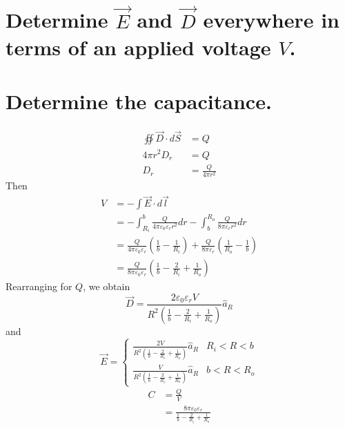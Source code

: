 \documentclass[answers]{exam}
\begin{document}
\begin{questions}

\begin{parts}
	\part{Determine $\vec{E}$ and $\vec{D}$ everywhere in terms of an applied voltage $V$.}
	\part{Determine the capacitance.}
\end{parts}

\begin{solution}
	\begin{align*}
		\oiint \vec{D} \cdot d\vec{S} &= Q \\
		4\pi r^2D_r &= Q \\
		D_r &= \frac{Q}{4\pi r^2}
	\end{align*}
	Then
	\begin{align*}
		V &= -\int \vec{E} \cdot d\vec{l} \\
		  &= -\int_{R_i}^b \frac{Q}{4\pi\varepsilon_0\varepsilon_r r^2} dr -\int_b^{R_o} \frac{Q}{8\pi\varepsilon_r r^2} dr \\
		  &= \frac{Q}{4\pi\varepsilon_0\varepsilon_r}\left(\frac{1}{b} - \frac{1}{R_i}\right) + \frac{Q}{8\pi\varepsilon_r}\left(\frac{1}{R_o} - \frac{1}{b}\right) \\
		  &= \frac{Q}{8\pi\varepsilon_0\varepsilon_r}\left(\frac{1}{b} - \frac{2}{R_i} + \frac{1}{R_o}\right)
	\end{align*}
	Rearranging for $Q$, we obtain
	$$\vec{D} = \frac{2\varepsilon_0\varepsilon_rV}{R^2\left(\frac{1}{b} - \frac{2}{R_i} + \frac{1}{R_o}\right)}\hat{a}_R$$
	and
	$$\vec{E} = \begin{cases} \frac{2V}{R^2\left(\frac{1}{b} - \frac{2}{R_i} + \frac{1}{R_o}\right)}\hat{a}_R & R_i < R < b \\ \frac{V}{R^2\left(\frac{1}{b} - \frac{2}{R_i} + \frac{1}{R_o}\right)}\hat{a}_R & b < R < R_o \end{cases}$$
	\begin{align*}
		C &= \frac{Q}{V} \\
		  &= \frac{8\pi\varepsilon_0\varepsilon_r}{\frac{1}{b} - \frac{2}{R_i} + \frac{1}{R_o}}
	\end{align*}
\end{solution}


\end{questions}
\end{document}
